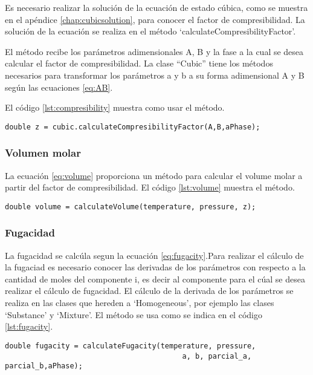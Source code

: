 	Es necesario realizar la solución de la ecuación de estado cúbica, como se muestra en el apéndice \ref{chap:cubicsolution}, para conocer el factor de compresibilidad. La solución de la ecuación se realiza en el método `calculateCompresibilityFactor'.

	El método recibe los parámetros adimensionales A, B y la fase a la cual se desea calcular el factor de compresibilidad. La clase ``Cubic'' tiene los métodos necesarios para transformar los parámetros a y b a su forma adimensional A y B según las ecuaciones \ref{eq:AB}.

	El código \ref{lst:compresibility} muestra como usar el método.
\begin{lstlisting}[label={lst:compresibility},caption={Cálculo del factor de compresibilidad con una ecuación de estado cúbica, proporcionando como argumento los parámetros adimensionales $A$,$B$, y la fase a la cual se desea calcular el factor}]
	double z = cubic.calculateCompresibilityFactor(A,B,aPhase);
\end{lstlisting}
	\subsubsection{Volumen molar}

	La ecuación \ref{eq:volume} proporciona un método para calcular el volume molar a partir del factor de compresibilidad. El código \ref{lst:volume} muestra el método.
\begin{lstlisting}[label={lst:volume},caption={Cálculo del volumen molar usando una ecuación de estado cúbica, el método recibe los parámetros de temperatura, presión y factor acéntrico}]
	double volume = calculateVolume(temperature, pressure, z);
\end{lstlisting}	
	\subsubsection{Fugacidad}
	La fugacidad se calcúla segun la ecuación \ref{eq:fugacity}.Para realizar el cálculo de la fugaciad es necesario conocer las derivadas de los parámetros con respecto a la cantidad de moles del componente i, es decir al componente para el cúal se desea realizar el cálculo de fugacidad. El cálculo de la derivada de los parámetros se realiza en las clases que hereden a `Homogeneous', por ejemplo las clases `Substance' y `Mixture'.
	El método se usa como se indica en el código \ref{lst:fugacity}.
\begin{lstlisting}[label={lst:fugacity},caption={Cálculo de fugacidad usando una ecuación de estad cúbica, el método recibe los parámetros de temperatura, presión ,los parámetros de la ecuación cúbica $a$ y $b$, las derivadas con respecto a la cantidad de moles $partial_a$, $partial_b$ y finalmente la fase a la que se desea el cálculo de la fugacidad.}]
	double fugacity = calculateFugacity(temperature, pressure,
										 a, b, parcial_a, parcial_b,aPhase);
\end{lstlisting}


